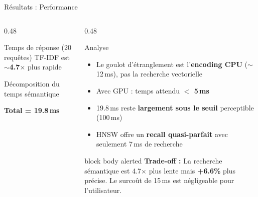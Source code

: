 \documentclass[aspectratio=169, 10pt]{beamer}
\begin{document}
\begin{frame}{R\'{e}sultats : Performance}
\begin{columns}[T]
\begin{column}{0.48\textwidth}
\begin{block}{Temps de r\'{e}ponse (20 requ\^{e}tes)}
        {\footnotesize TF-IDF est $\sim$\textbf{4.7$\times$} plus rapide}
      \end{block}
      \vspace{0.5em}
      \begin{block}{D\'{e}composition du temps s\'{e}mantique}
        \centering
        {\tiny\textbf{Total = 19.8\,ms}}
      \end{block}
    \end{column}
    \begin{column}{0.48\textwidth}
      \begin{block}{\textcolor{ASTRAwhite}{Analyse}}
        \begin{itemize}
          \item Le goulot d'\'{e}tranglement est l'\textbf{encoding CPU} ($\sim$12\,ms), pas la recherche vectorielle
          \item Avec GPU : temps attendu \textbf{$<$ 5\,ms}
          \item 19.8\,ms reste \textbf{largement sous le seuil} perceptible (100\,ms)
          \item HNSW offre un \textbf{recall quasi-parfait} avec seulement 7\,ms de recherche
        \end{itemize}
      \end{block}
      \vspace{0.5em}
      \begin{beamercolorbox}[wd=\textwidth, rounded=true, sep=5pt]{block body alerted}
        \textbf{\textcolor{ASTRAnavy}{Trade-off :}}
        \textcolor{ASTRAnavy}{\footnotesize La recherche s\'{e}mantique est 4.7$\times$ plus lente mais \textbf{+6.6\%} plus pr\'{e}cise. Le surco\^{u}t de 15\,ms est n\'{e}gligeable pour l'utilisateur.}
      \end{beamercolorbox}
    \end{column}
  \end{columns}
\end{frame}
\end{document}
